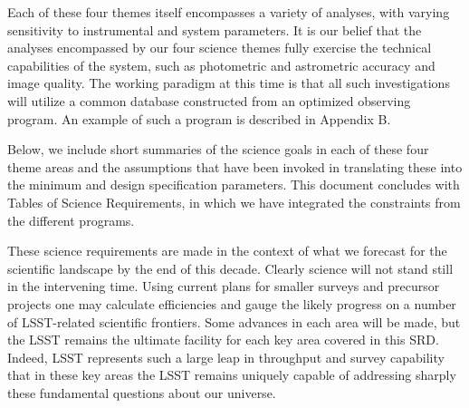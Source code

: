 Each of these four themes itself encompasses a variety of analyses, with
varying sensitivity to instrumental and system parameters.  It is our belief
that the analyses encompassed by our four science themes
fully exercise the technical capabilities of the system,
such as photometric and astrometric accuracy and image quality.  The working
paradigm at this time is that all such investigations will utilize a common
database constructed from an optimized observing program. An example of
such a program is described in Appendix B.

Below, we include short summaries of the science goals in each of these four
theme areas and the assumptions that have been invoked in translating these
into the minimum and design specification parameters.  This document concludes
with Tables of Science Requirements, in which we have integrated the
constraints from the different programs.

These science requirements are made in the context of what we forecast for
the scientific landscape by the end of this decade. Clearly science will not stand still in the
intervening time.  Using current plans for smaller surveys and precursor projects
one may calculate efficiencies and gauge the likely progress on a number of
LSST-related scientific frontiers. Some advances in each area will be made,
but the LSST remains the ultimate facility for each key area covered in this SRD.
Indeed, LSST represents such a large leap in throughput and survey capability
that in these key areas the LSST remains uniquely capable of addressing sharply
these fundamental questions about our universe.

